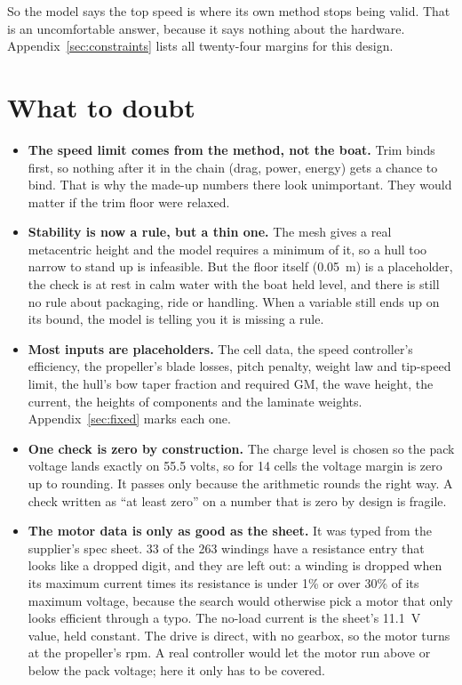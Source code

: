 \documentclass[11pt,a4paper]{article}
\renewcommand{\_}{\textunderscore\allowbreak}
\begin{document}
So the model says the top speed is where its own method stops being valid. That is an uncomfortable answer, because it says nothing about the hardware. Appendix~\ref{sec:constraints} lists all twenty-four margins for this design.

\section*{What to doubt}
\label{sec:caveats}

\begin{itemize}
  \item \textbf{The speed limit comes from the method, not the boat.} Trim binds first, so nothing after it in the chain (drag, power, energy) gets a chance to bind. That is why the made-up numbers there look unimportant.
        They would matter if the trim floor were relaxed.
  \item \textbf{Stability is now a rule, but a thin one.} The mesh gives a real metacentric height and the model requires a minimum of it, so a hull too narrow to stand up is infeasible. But the floor itself (0.05~m) is a placeholder, the check is at rest in calm water with the boat held level, and there is still no rule about packaging, ride or handling. When a variable still ends up on its bound, the model is telling you it is missing a rule.
  \item \textbf{Most inputs are placeholders.} The cell data, the speed controller's efficiency, the propeller's blade losses, pitch penalty, weight law and tip-speed limit, the hull's bow taper fraction and required GM, the wave height, the current, the heights of components and the laminate weights.
        Appendix~\ref{sec:fixed} marks each one.
  \item \textbf{One check is zero by construction.} The charge level is chosen so the pack voltage lands exactly on 55.5 volts, so for 14 cells the voltage margin is zero up to rounding. It passes only because the arithmetic rounds the right way.
        A check written as ``at least zero'' on a number that is zero by design is fragile.
  \item \textbf{The motor data is only as good as the sheet.} It was typed from the supplier's spec sheet. 33 of the 263 windings have a resistance entry that looks like a dropped digit, and they are left out: a winding is dropped when its maximum current times its resistance is under 1\% or over 30\% of its maximum voltage, because the search would otherwise pick a motor that only looks efficient through a typo. The no-load current is the sheet's 11.1~V value, held constant. The drive is direct, with no gearbox, so the motor turns at the propeller's rpm. A real controller would let the motor run above or below the pack voltage; here it only has to be covered.

\end{itemize}
\end{document}
